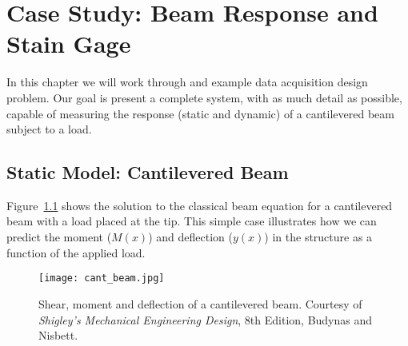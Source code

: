 \chapter{Case Study: Beam Response and Stain Gage}\label{c:strain}

In this chapter we will work through and example data acquisition design problem.  Our goal is present a complete system, with as much detail as possible, capable of measuring the response (static and dynamic) of a cantilevered beam subject to a load.

\section{Static Model: Cantilevered Beam}

Figure~\ref{f:cant} shows the solution to the classical beam equation for a cantilevered beam with a load placed at the tip.  This simple case illustrates how we can predict the moment ($M(x)$) and deflection ($y(x)$) in the structure as a function of the applied load.

\begin{figure}[hb!]
\centerline{
{\texttt{[image: cant\_beam.jpg]}}}
\caption{Shear, moment and deflection of a cantilevered beam.  Courtesy of \emph{Shigley's Mechanical Engineering Design}, 8th Edition, Budynas and Nisbett.}
\label{f:cant}
\end{figure}


